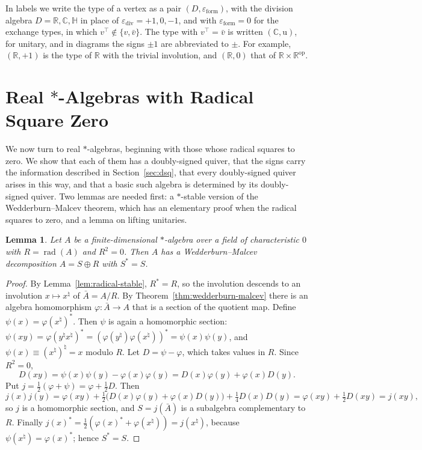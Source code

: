 \documentclass[12pt, a4paper]{report}
\theoremstyle{plain}
\newtheorem{lemma}[theorem]{Lemma}
\theoremstyle{definition}
\theoremstyle{remark}
\theoremstyle{plain}
\newcommand{\rad}[0]{\operatorname{rad}} %
\newcommand{\epsilondiv}{\varepsilon_{\mathrm{div}}}
\newcommand{\epsilonform}{\varepsilon_{\mathrm{form}}}
\newcommand{\RR}{\mathbb{R}}
\newcommand{\CC}{\mathbb{C}}
\newcommand{\HH}{\mathbb{H}}
\begin{document}
In labels we write the type of a vertex as a pair $(D,\epsilonform)$, with the division algebra $D=\RR,\CC,\HH$ in place of $\epsilondiv=+1,0,-1$, and with $\epsilonform=0$ for the exchange types, in which $v^{\top}\notin\{v,\bar v\}$. The type with $v^{\top}=\bar v$ is written $(\CC,\mathrm{u})$, for unitary, and in diagrams the signs $\pm1$ are abbreviated to $\pm$. For example, $(\RR,+1)$ is the type of $\RR$ with the trivial involution, and $(\RR,0)$ that of $\RR\times\RR^{\mathrm{op}}$.
\section{Real \texorpdfstring{$*$}{*}-Algebras with Radical Square Zero}
\label{sec:classification}
We now turn to real $*$-algebras, beginning with those whose radical squares to zero. We show that each of them has a doubly-signed quiver, that the signs carry the information described in Section~\ref{sec:dsq}, that every doubly-signed quiver arises in this way, and that a basic such algebra is determined by its doubly-signed quiver. Two lemmas are needed first: a $*$-stable version of the Wedderburn--Malcev theorem, which has an elementary proof when the radical squares to zero, and a lemma on lifting unitaries.

\begin{lemma}\label{lem:star-wedderburn}
Let $A$ be a finite-dimensional $*$-algebra over a field of characteristic $0$ with $R=\rad(A)$ and $R^2=0$. Then $A$ has a Wedderburn--Malcev decomposition $A=S\oplus R$ with $S^*=S$.
\end{lemma}
\begin{proof}
By Lemma~\ref{lem:radical-stable}, $R^*=R$, so the involution descends to an involution $x\mapsto x^\natural$ of $\bar A=A/R$. By Theorem~\ref{thm:wedderburn-malcev} there is an algebra homomorphism $\varphi:\bar A\to A$ that is a section of the quotient map. Define $\psi(x)=\varphi(x^\natural)^*$. Then $\psi$ is again a homomorphic section: $\psi(xy)=\varphi(y^\natural x^\natural)^*=(\varphi(y^\natural)\varphi(x^\natural))^*=\psi(x)\psi(y)$, and $\psi(x)\equiv (x^\natural)^\natural=x$ modulo $R$. Let $D=\psi-\varphi$, which takes values in $R$. Since $R^2=0$,
\[ D(xy)=\psi(x)\psi(y)-\varphi(x)\varphi(y)=D(x)\varphi(y)+\varphi(x)D(y). \]
Put $j=\tfrac12(\varphi+\psi)=\varphi+\tfrac12D$. Then
\[ j(x)j(y)=\varphi(xy)+\tfrac12\bigl(D(x)\varphi(y)+\varphi(x)D(y)\bigr)+\tfrac14D(x)D(y)=\varphi(xy)+\tfrac12D(xy)=j(xy), \]
so $j$ is a homomorphic section, and $S=j(\bar A)$ is a subalgebra complementary to $R$. Finally $j(x)^*=\tfrac12(\varphi(x)^*+\varphi(x^\natural))=j(x^\natural)$, because $\psi(x^\natural)=\varphi(x)^*$; hence $S^*=S$.
\end{proof}
\end{document}
